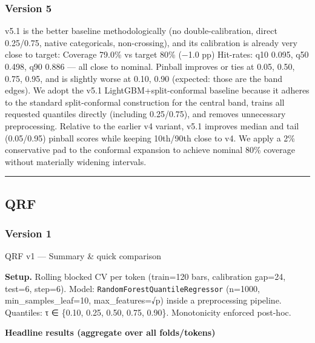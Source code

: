 \documentclass[
  a4paper,
  DIV=11,
  numbers=noendperiod]{scrreprt}
\begin{document}
\subsubsection{Version 5}\label{version-5}

v5.1 is the better baseline methodologically (no double-calibration,
direct 0.25/0.75, native categoricals, non-crossing), and its
calibration is already very close to target: Coverage 79.0\% vs target
80\% (−1.0 pp) Hit-rates: q10 0.095, q50 0.498, q90 0.886 --- all close
to nominal. Pinball improves or ties at 0.05, 0.50, 0.75, 0.95, and is
slightly worse at 0.10, 0.90 (expected: those are the band edges). We
adopt the v5.1 LightGBM+split-conformal baseline because it adheres to
the standard split-conformal construction for the central band, trains
all requested quantiles directly (including 0.25/0.75), and removes
unnecessary preprocessing. Relative to the earlier v4 variant, v5.1
improves median and tail (0.05/0.95) pinball scores while keeping
10th/90th close to v4. We apply a 2\% conservative pad to the conformal
expansion to achieve nominal 80\% coverage without materially widening
intervals.

\begin{center}\rule{0.5\linewidth}{0.5pt}\end{center}

\subsection{QRF}\label{qrf}

\subsubsection{Version 1}\label{version-1-2}

QRF v1 --- Summary \& quick comparison

\textbf{Setup.} Rolling blocked CV per token (train=120 bars,
calibration gap=24, test=6, step=6). Model:
\texttt{RandomForestQuantileRegressor} (n=1000, min\_samples\_leaf=10,
max\_features=√p) inside a preprocessing pipeline. Quantiles: τ ∈
\{0.10, 0.25, 0.50, 0.75, 0.90\}. Monotonicity enforced post-hoc.

\textbf{Headline results (aggregate over all folds/tokens)}
\end{document}
